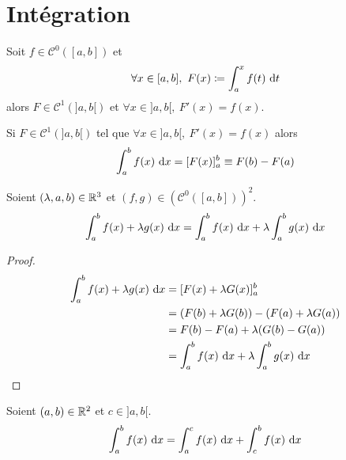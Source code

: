 \chapter{Intégration}

\begin{theorem}
	Soit $f \in \mathcal{C}^0([a, b])$ et 
	\begin{align*}
		\forall x \in [a,b],\ F(x) \coloneqq \int_a^x f(t) \ \diffd t
	\end{align*}
	alors $F \in \mathcal{C}^1(]a, b[)$ et $\forall x \in ]a, b[,\ F'(x) = f(x)$.    
\end{theorem}

\begin{corollary}
    Si $F \in \mathcal{C}^1(]a, b[)$ tel que $\forall x \in ]a, b[,\ F'(x) = f(x)$ alors
	\begin{align*}
		\int_a^b f(x) \ \diffd x = [F(x)]_a^b \equiv F(b) - F(a) 
	\end{align*}
\end{corollary}

\begin{proposition}
	Soient $(\lambda, a, b) \in \mathbb{R}^3$ et $(f, g) \in (\mathcal{C}^0([a, b]))^2$.
	\begin{align*}
		\int_a^b f(x) + \lambda g(x) \ \diffd x = \int_a^b f(x) \ \diffd x + \lambda \int_a^b g(x) \ \diffd x 
	\end{align*}
\end{proposition}

\begin{proof}
    \begin{align*}
        \int_{a}^{b} f(x) + \lambda g(x) \ \diffd x &= [F(x) + \lambda G(x)]_a^b \\
                                                    &= (F(b) + \lambda G(b)) - (F(a) + \lambda G(a)) \\
                                                    &= F(b) - F(a) + \lambda (G(b) - G(a)) \\
                                                    &= \int_{a}^{b} f(x) \ \diffd x + \lambda \int_{a}^{b} g(x) \ \diffd x
    \end{align*}
\end{proof}

\begin{proposition}
	Soient $(a, b) \in \mathbb{R}^2$ et $c \in ]a, b[$.
	\begin{align*}
		\int_a^b f(x) \ \diffd x = \int_a^c f(x) \ \diffd x + \int_c^b f(x) \ \diffd x
	\end{align*}
\end{proposition}


